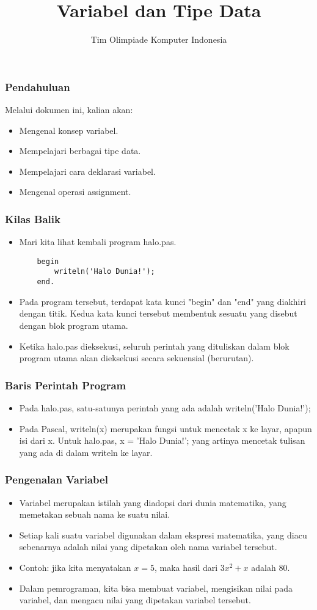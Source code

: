 \documentclass{beamer}
\title{Variabel dan Tipe Data}
\author{Tim Olimpiade Komputer Indonesia}
\begin{document}
\begin{frame}
\titlepage
\end{frame}

\begin{frame}
\frametitle{Pendahuluan}
Melalui dokumen ini, kalian akan:
\begin{itemize}
	\item Mengenal konsep variabel.
	\item Mempelajari berbagai tipe data.
	\item Mempelajari cara deklarasi variabel.
	\item Mengenal operasi assignment.
\end{itemize}
\end{frame}

\begin{frame}[fragile]
\frametitle{Kilas Balik}
\begin{itemize}
	\item Mari kita lihat kembali program halo.pas.
	\begin{lstlisting}
	begin
	    writeln('Halo Dunia!');
	end.
	\end{lstlisting}
	\item Pada program tersebut, terdapat kata kunci "begin" dan "end" yang diakhiri dengan titik. Kedua kata kunci tersebut membentuk sesuatu yang disebut dengan blok program utama.
	\item Ketika halo.pas dieksekusi, seluruh perintah yang dituliskan dalam blok program utama akan dieksekusi secara sekuensial (berurutan).
\end{itemize}
\end{frame}

\begin{frame}
\frametitle{Baris Perintah Program}
\begin{itemize}
	\item Pada halo.pas, satu-satunya perintah yang ada adalah writeln('Halo Dunia!');
	\item Pada Pascal, writeln(x) merupakan fungsi untuk mencetak x ke layar, apapun isi dari x. Untuk halo.pas, x = 'Halo Dunia!';
	yang artinya mencetak tulisan yang ada di dalam writeln ke layar.
\end{itemize}
\end{frame}

\begin{frame}
\frametitle{Pengenalan Variabel}
\begin{itemize}
	\item Variabel merupakan istilah yang diadopsi dari dunia matematika, yang memetakan sebuah nama ke suatu nilai.
	\item Setiap kali suatu variabel digunakan dalam ekspresi matematika, yang diacu sebenarnya adalah nilai yang dipetakan oleh nama variabel tersebut.
	\item Contoh: jika kita menyatakan $x=5$, maka hasil dari $3x^2 + x$ adalah $80$.
	\item Dalam pemrograman, kita bisa membuat variabel, mengisikan nilai pada variabel, dan mengacu nilai yang dipetakan variabel tersebut.
\end{itemize}
\end{frame}
\end{document}
